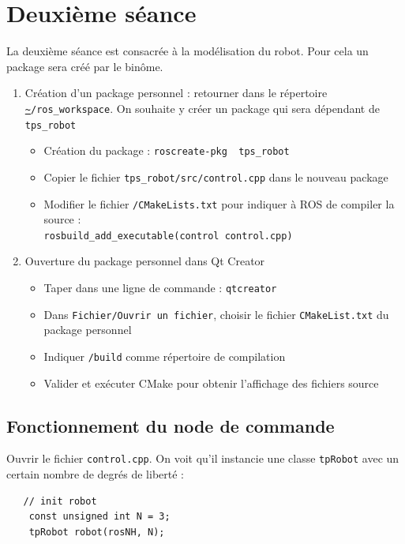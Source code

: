 \documentclass[12pt,a4paper]{article}
\begin{document}
\newpage
\section{Deuxième séance}
La deuxième séance est consacrée à la modélisation du robot.
Pour cela un package sera créé par le binôme. 
\begin{enumerate}
 \item  Création d'un package personnel : retourner dans le répertoire \texttt{\url{~}/ros\_workspace}. On souhaite y créer un package qui sera dépendant de \texttt{tps\_robot}
  \begin{itemize}
   \item Création du package : \texttt{roscreate-pkg \bin ~tps\_robot}
   \item Copier le fichier \texttt{tps\_robot/src/control.cpp} dans le nouveau package
   \item Modifier le fichier \texttt{\bin/CMakeLists.txt} pour indiquer à ROS de compiler la source : \\
   \texttt{rosbuild\_add\_executable(control control.cpp)}
  \end{itemize}
  \item Ouverture du package personnel dans Qt Creator
  \begin{itemize}
 \item Taper dans une ligne de commande : \texttt{qtcreator}
 \item Dans \texttt{Fichier/Ouvrir un fichier}, choisir le fichier \texttt{CMakeList.txt} du package personnel
 \item Indiquer \texttt{\bin/build} comme répertoire de compilation
 \item Valider et exécuter CMake pour obtenir l'affichage des fichiers source
\end{itemize}
\end{enumerate}

\subsection{Fonctionnement du node de commande}

Ouvrir le fichier \texttt{control.cpp}. On voit qu'il instancie une classe \texttt{tpRobot} avec un certain nombre de degrés de liberté :
\begin{verbatim}
   // init robot
    const unsigned int N = 3;
    tpRobot robot(rosNH, N);
\end{verbatim}
\end{document}
